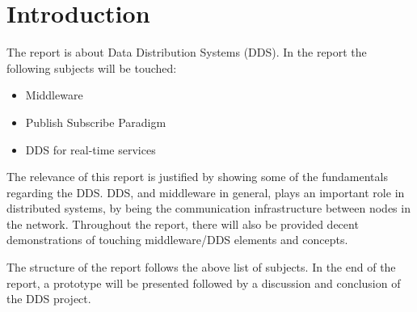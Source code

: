 \chapter{Introduction}

The report is about Data Distribution Systems (DDS). In the report the following subjects will be touched:

\begin{itemize}
\item Middleware
\item Publish Subscribe Paradigm
\item DDS for real-time services
\end{itemize}

The relevance of this report is justified by showing some of the fundamentals regarding the DDS.
DDS, and middleware in general, plays an important role in distributed systems, by being the communication infrastructure between nodes in the network. 
Throughout the report, there will also be provided decent demonstrations of touching middleware/DDS elements and concepts.

The structure of the report follows the above list of subjects. In the end of the report, a prototype will be presented followed by a discussion and conclusion of the DDS project. 